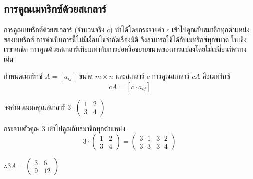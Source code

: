 \subsection{การคูณเมทริกซ์ด้วยสเกลาร์}
\label{ssec:scalar-mult}
การคูณเมทริกซ์ด้วยสเกลาร์ (จำนวนจริง $c$) ทำได้โดยกระจายค่า $c$ เข้าไปคูณกับสมาชิกทุกตำแหน่งของเมทริกซ์ การดำเนินการนี้ไม่มีเงื่อนไขจำกัดเรื่องมิติ จึงสามารถใช้ได้กับเมทริกซ์ทุกขนาด ในเชิงเรขาคณิต การคูณด้วยสเกลาร์เทียบเท่ากับการย่อหรือขยายขนาดของการแปลงโดยไม่เปลี่ยนทิศทางเดิม~\parencite{strang2023linear}

\begin{definition}
กำหนดเมทริกซ์ $A = [a_{ij}]$ ขนาด $m \times n$ และสเกลาร์ $c$ การคูณสเกลาร์ $cA$ คือเมทริกซ์
\[ cA = [c \cdot a_{ij}] \]
\end{definition}

\begin{ex}
\label{ex:scalar-multiply}
จงคำนวณผลคูณสเกลาร์ $3 \cdot \begin{pmatrix} 1 & 2 \\ 3 & 4 \end{pmatrix}$
\end{ex}
\begin{solution}
กระจายตัวคูณ 3 เข้าไปคูณกับสมาชิกทุกตำแหน่ง \[ 3 \cdot \begin{pmatrix} 1 & 2 \\ 3 & 4 \end{pmatrix} = \begin{pmatrix} 3 \cdot 1 & 3 \cdot 2 \\ 3 \cdot 3 & 3 \cdot 4 \end{pmatrix} \]

$\therefore 3A = \begin{pmatrix} 3 & 6 \\ 9 & 12 \end{pmatrix}$ \solhere
\end{solution}

